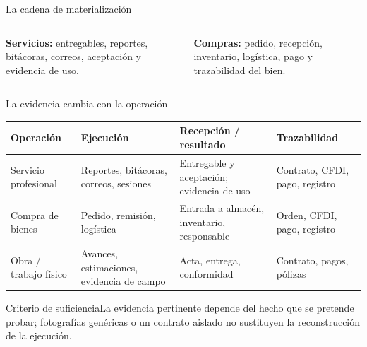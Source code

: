 \documentclass[spanish,aspectratio=169,xcolor={dvipsnames,table}]{beamer}
\begin{document}
\begin{frame}{La cadena de materialización}
  \begin{center}
  \end{center}
  \vfill
  \begin{columns}[T]
    \begin{column}{.48\textwidth}\textbf{Servicios:} entregables, reportes, bitácoras, correos, aceptación y evidencia de uso.\end{column}
    \begin{column}{.48\textwidth}\textbf{Compras:} pedido, recepción, inventario, logística, pago y trazabilidad del bien.\end{column}
  \end{columns}
\end{frame}

\begin{frame}{La evidencia cambia con la operación}
  \begin{tabularx}{\linewidth}{@{}p{.18\linewidth}Y Y Y@{}}
    \toprule
    \textbf{Operación} & \textbf{Ejecución} & \textbf{Recepción / resultado} & \textbf{Trazabilidad}\\
    \midrule
    Servicio profesional & Reportes, bitácoras, correos, sesiones & Entregable y aceptación; evidencia de uso & Contrato, CFDI, pago, registro\\
    Compra de bienes & Pedido, remisión, logística & Entrada a almacén, inventario, responsable & Orden, CFDI, pago, registro\\
    Obra / trabajo físico & Avances, estimaciones, evidencia de campo & Acta, entrega, conformidad & Contrato, pagos, pólizas\\
    \bottomrule
  \end{tabularx}
  \vfill
  \begin{block}{Criterio de suficiencia}\centering La evidencia pertinente depende del hecho que se pretende probar; fotografías genéricas o un contrato aislado no sustituyen la reconstrucción de la ejecución.\end{block}
\end{frame}
\end{document}
